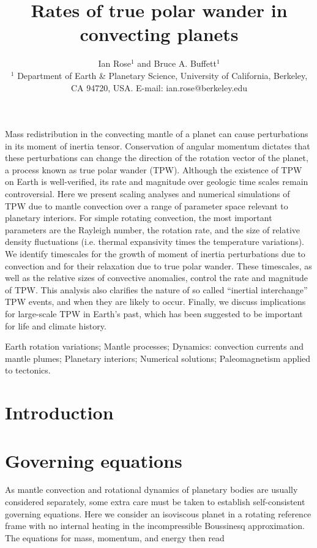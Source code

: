 \documentclass[extra,onecolumn]{gji}
\title[TPW Rates]
  {Rates of true polar wander in convecting planets}
\author[I. Rose and B. Buffett]
  {Ian Rose$^1$ and Bruce A. Buffett$^1$ \\
  $^1$ Department of Earth \& Planetary Science, University of California, Berkeley, CA 94720, USA.  E-mail: ian.rose@berkeley.edu
  }
\date{}
\begin{document}
\label{firstpage}

\maketitle

\begin{summary}
Mass redistribution in the convecting mantle of a planet can cause perturbations in its moment of inertia tensor. 
Conservation of angular momentum dictates that these perturbations can change the direction of the rotation vector of the planet, a process known as true polar wander (TPW). 
Although the existence of TPW on Earth is well-verified, its rate and magnitude over geologic time scales remain controversial. 
Here we present scaling analyses and numerical simulations of TPW due to mantle convection over a range of parameter space relevant to planetary interiors. 
For simple rotating convection, the most important parameters are the Rayleigh number, the rotation rate, and the size of relative density fluctuations (i.e. thermal expansivity times the temperature variations). 
We identify timescales for the growth of moment of inertia perturbations due to convection and for their relaxation due to true polar wander. 
These timescales, as well as the relative sizes of convective anomalies, control the rate and magnitude of TPW.
This analysis also clarifies the nature of so called ``inertial interchange'' TPW events, and when they are likely to occur.
Finally, we discuss implications for large-scale TPW in Earth's past, which has been suggested to be important for life and climate history.
\end{summary}

\begin{keywords}
Earth rotation variations; Mantle processes; Dynamics: convection currents and mantle plumes; Planetary interiors; Numerical solutions; Paleomagnetism applied to tectonics.
\end{keywords}

\section{Introduction}
\label{sec:intro}

\section{Governing equations}
\label{sec:govern}

As mantle convection and rotational dynamics of planetary bodies are usually considered separately, some extra care must be taken to establish self-consistent governing equations.  
Here we consider an isoviscous planet in a rotating reference frame with no internal heating in the incompressible Boussinesq approximation.  The equations for mass, momentum, and energy then read
\end{document}
